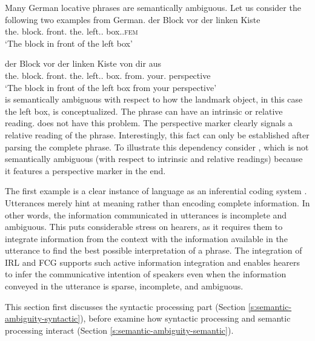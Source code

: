 Many German locative phrases are semantically ambiguous.
Let us consider the following two examples from German.
\ea
\label{e:der-block-vor-der-linken-kiste}
\gll der Block vor der linken Kiste\\
the.{\NOM} block.{\NOM} front.{\PREP} the.{\DAT} left.{\ADJ}.{\DAT} box.{\DAT}.{\textsc{fem}}\\ 
\glt `The block in front of the left box'\\
\item
\label{e:der-block-vor-der-linken-kiste-von-dir-aus}
\gll der Block vor der linken Kiste von dir aus \\
the.{\NOM} block.{\NOM} front.{\PREP} the.{\DAT} left.{\ADJ}.{\DAT} box.{\DAT} from.{\PREP} your.{\DAT}  perspective\\
\glt `The block in front of the left box from your perspective'\\
\z
{} is semantically ambiguous with 
respect to how the landmark object, in this case the left box, is 
conceptualized. The phrase can have an intrinsic or relative reading.
 does not have this problem. 
The perspective marker clearly signals a relative reading of the phrase.
Interestingly, this fact can only be established after parsing the complete phrase. 
To illustrate this dependency consider , 
which is not semantically ambiguous (with respect to intrinsic and relative readings)
because it features a perspective marker in the end. 

The first example is a clear instance of language as an inferential coding 
system \citep{sperber1986relevance}. Utterances merely hint at meaning 
rather than encoding complete information.
In other words, the information communicated in utterances is incomplete and
ambiguous. This puts considerable stress on hearers, as it requires them
to integrate information from the context with the information available in the
utterance to find the best possible interpretation of a phrase.
The integration of IRL and FCG supports such active information integration
and enables hearers to infer the communicative intention of speakers
even when the information conveyed in the utterance is sparse, incomplete,
and ambiguous. 

This section first discusses the syntactic processing part 
(Section \ref{s:semantic-ambiguity-syntactic}), before examine how 
syntactic processing and semantic processing 
interact (Section \ref{s:semantic-ambiguity-semantic}).


